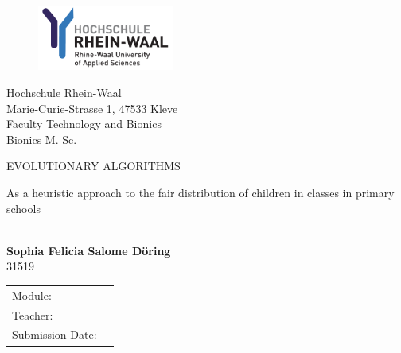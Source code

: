 \selectfont
\begin{titlepage}
\date{}

		
	\begin{figure}[h]\vspace{1 cm}
    \centering
    \includegraphics[width = 0.4\textwidth]{Pictures/HSRW_Logo.png}
    \end{figure}

	\begin{center}

	\large{
	Hochschule Rhein-Waal\\
	Marie-Curie-Strasse 1, 47533 Kleve\\
	Faculty Technology and Bionics\\
	Bionics M. Sc.\\}
	\vspace{2cm}
	
	\noindent\makebox[\linewidth]{\rule{\textwidth}{0.2pt}}
	\vspace{0.1cm}
	
	\begin{LARGE}\begin{bfseries} EVOLUTIONARY ALGORITHMS\\\end{bfseries} \end{LARGE}
	\vspace{0.3 cm}
\begin{LARGE}As a heuristic approach to the fair distribution of children in classes in primary schools\\ \end{LARGE}

\vspace{0.3cm}
		\noindent\makebox[\linewidth]{\rule{\textwidth}{0.2pt}}		

	
	\vspace{0.5cm}

		
\large{\textbf{\\Sophia Felicia Salome Döring}}
\large{{\\31519}}
\vspace{4.0cm} 
\end{center}

\vfill

\begin{tabular}{p{3cm}l}
    Module: & \\
    Teacher: & \\
    Submission Date: & \\
\end{tabular}

\thispagestyle{empty}



\end{titlepage}